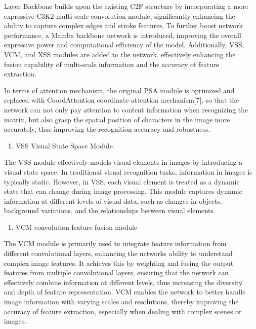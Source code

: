 \documentclass[
]{article}
\begin{document}
Layer Backbone builds upon the existing C2F structure by incorporating a
more expressive C3K2 multi-scale convolution module, significantly
enhancing the ability to capture complex edges and stroke features. To
further boost network performance, a Mamba backbone network is
introduced, improving the overall expressive power and computational
efficiency of the model. Additionally, VSS, VCM, and XSS modules are
added to the network, effectively enhancing the fusion capability of
multi-scale information and the accuracy of feature extraction.

In terms of attention mechanism, the original PSA module is optimized
and replaced with CoordAttention coordinate attention mechanism{[}7{]},
so that the network can not only pay attention to content information
when recognizing the matrix, but also grasp the spatial position of
characters in the image more accurately, thus improving the recognition
accuracy and robustness.

\begin{enumerate}
\def\labelenumi{\arabic{enumi}.}
\item
  VSS Visual State Space Module
\end{enumerate}

The VSS module effectively models visual elements in images by
introducing a visual state space. In traditional visual recognition
tasks, information in images is typically static. However, in VSS, each
visual element is treated as a dynamic state that can change during
image processing. This module captures dynamic information at different
levels of visual data, such as changes in objects, background
variations, and the relationships between visual elements.

\begin{enumerate}
\def\labelenumi{\arabic{enumi}.}
\setcounter{enumi}{1}
\item
  VCM convolution feature fusion module
\end{enumerate}

The VCM module is primarily used to integrate feature information from
different convolutional layers, enhancing the network\textquotesingle s
ability to understand complex image features. It achieves this by
weighting and fusing the output features from multiple convolutional
layers, ensuring that the network can effectively combine information at
different levels, thus increasing the diversity and depth of feature
representation. VCM enables the network to better handle image
information with varying scales and resolutions, thereby improving the
accuracy of feature extraction, especially when dealing with complex
scenes or images.
\end{document}

